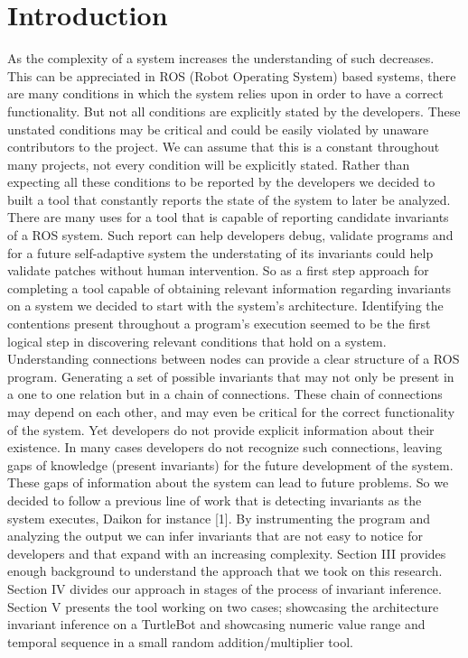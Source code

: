 \documentclass[10pt, conference]{IEEEtran}
\begin{document}
\section{Introduction}
As the complexity of a system increases the understanding of such decreases. This can be appreciated in ROS (Robot Operating System) based systems, there are many conditions in which the system relies upon in order to have a correct functionality. But not all conditions are explicitly stated by the developers. These unstated conditions may be critical and could be easily violated by unaware contributors to the project. We can assume that this is a constant throughout many projects, not every condition will be explicitly stated. Rather than expecting all these conditions to be reported by the developers we decided to built a tool that constantly reports the state of the system to later be analyzed. \newline  \indent There are many uses for a tool that is capable of reporting candidate invariants of a ROS system. Such report can help developers debug, validate programs and for a future self-adaptive system the understating of its invariants could help validate patches without human intervention. So as a first step approach for completing a tool capable of obtaining relevant information regarding invariants on a system we decided to start with the system's architecture. Identifying the contentions present throughout a program's execution seemed to be the first logical step in discovering relevant conditions that hold on a system.
\newline  \indent Understanding connections between nodes can provide a clear structure of a ROS program. Generating a set of possible invariants that may not only be present in a one to one relation but in a chain of connections. These chain of connections may depend on each other, and may even be critical for the correct functionality of the system. Yet developers do not provide explicit information about their existence. In many cases developers do not recognize such connections, leaving gaps of knowledge (present invariants) for the future development of the system. These gaps of information about the system can lead to future problems.
\newline  \indent So we decided to follow a previous line of work that is detecting invariants as the system executes, Daikon for instance [1]. By instrumenting the program and analyzing the output we can infer invariants that are not easy to notice for developers and that expand with an increasing complexity.  
\newline \indent Section III provides enough background to understand the approach that we took on this research. Section IV divides our approach in stages of the process of invariant inference. Section V presents the tool working on two cases; showcasing the architecture invariant inference on a TurtleBot and showcasing numeric value range and temporal sequence in a small random addition/multiplier tool.
\end{document}
